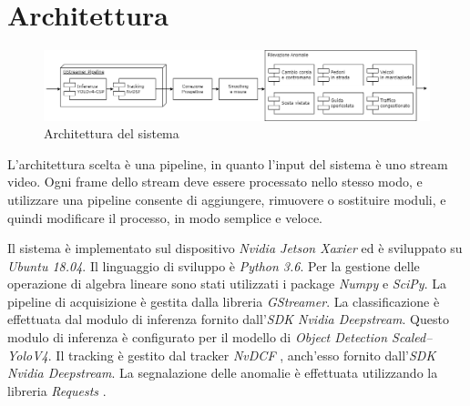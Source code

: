 \chapter{Architettura}
\label{sec:architettura}

\begin{figure}
    \centering
    \includegraphics[width=\textwidth]{images/arch.png}
    \caption{Architettura del sistema}
\end{figure}

L'architettura scelta è una pipeline, in quanto l'input del sistema è uno stream video.
Ogni frame dello stream deve essere processato nello stesso modo, e utilizzare una pipeline consente di aggiungere, rimuovere o sostituire moduli, e quindi modificare il processo, in modo semplice e veloce.

Il sistema è implementato sul dispositivo \emph{Nvidia Jetson Xaxier}\cite{arch:jetson} ed è sviluppato su \emph{Ubuntu 18.04}\cite{arch:ubuntu}.
Il linguaggio di sviluppo è \emph{Python 3.6}\cite{arch:python}.
Per la gestione delle operazione di algebra lineare sono stati utilizzati i package \emph{Numpy}\cite{arch:numpy} e \emph{SciPy}\cite{arch:scipy}.
La pipeline di acquisizione è gestita dalla libreria \emph{GStreamer}\cite{arch:gstreamer}.
La classificazione è effettuata dal modulo di inferenza fornito dall'\emph{SDK Nvidia Deepstream}\cite{arch:deepstream}.
Questo modulo di inferenza è configurato per il modello di \emph{Object Detection Scaled--YoloV4}\cite{yolocsp}.
Il tracking è gestito dal tracker \emph{NvDCF} \cite{nvdcf}, anch'esso fornito dall'\emph{SDK Nvidia Deepstream}.
La segnalazione delle anomalie è effettuata utilizzando la libreria \emph{Requests} \cite{arch:requests}.
